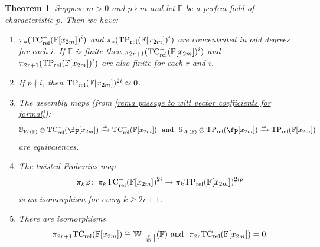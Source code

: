 \documentclass[english,10pt]{amsart}
\newcommand{\sph}{\mathbb{S}}
\newcommand{\rel}{\textup{rel}}
\newcommand{\field}{\mathbb{F}}
\newtheorem{thm}{Theorem}[section]
\theoremstyle{definition}
\numberwithin{equation}{section}
\newcommand{\rntc}{\mathrm{TC}_{\rel}^{-}}
\newcommand{\rtp}{\mathrm{TP}_{\rel}}
\newcommand{\rtc}{\mathrm{TC}_{\rel}}
\newcommand{\pis}{\pi_*}
\def\co{\colon\thinspace}
\DeclarePairedDelimiter\floor{\lfloor}{\rfloor}
\begin{document}
\begin{thm}\label{theo tc ntc tp of formal dgas}
Suppose $m>0$ and $p\nmid m$ and let $\field$ be a perfect field of characteristic $p$. Then we have: 
\begin{enumerate}
 \item    \label{item 1 frobenius is iso}
 $\pis(\rntc(\field[x_{2m}])^i)$ and $\pis (\rtp(\field[x_{2m}])^i)$  are concentrated in odd degrees for each $i$.  If $\field$ is finite then $\pi_{2r+1}(\rntc(\field[x_{2m}])^i)$ and $\pi_{2r+1}(\rtp(\field[x_{2m}])^i)$ are also finite for each $r$ and $i$. 
 \item \label{item 2 frobenius is iso}  If $p \nmid i$, then $\rtp(\field[x_{2m}])^{2i}\simeq 0$.
 \item \label{item 2half frobenius is iso}
 The assembly maps (from \autoref{rema passage to witt vector coefficients for formal}):
\[\sph_{W(\field)} \otimes \rntc(\fp[x_{2m}]) \xrightarrow{\simeq} \rntc(\field[x_{2m}]) \textup{\ \ and \ } \sph_{W(\field)} \otimes \rtp(\fp[x_{2m}]) \xrightarrow{\simeq} \rtp(\field[x_{2m}])\]
 are equivalences. 
 \item\label{item 3 frobenius is iso} The twisted Frobenius map
 \[\pi_k \varphi \co \pi_k\rntc(\field[x_{2m}])^{2i} \to \pi_k\rtp(\field[x_{2m}])^{2ip} \]
 is an isomorphism for every $k \geq 2i+1$. 
 \item \label{item 4 frobenius is iso}  There are isomorphisms \[\pi_{2r+1}\rtc(\field[x_{2m}]) \cong \mathbb{W}_{\floor*{\frac{r}{m}}}(\field) \textup{\ and \ } \pi_{2r}\rtc(\field[x_{2m}]) = 0.\]
\end{enumerate}
\end{thm}
\end{document}

